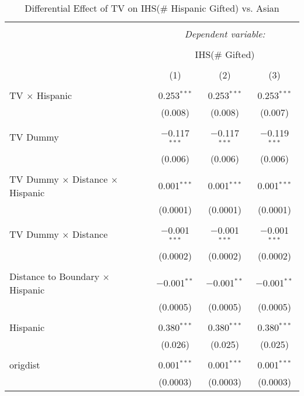
\begin{table}[!htbp] \centering 
  \caption{Differential Effect of TV on IHS(\# Hispanic Gifted) vs. Asian} 
  \label{} 
\begin{tabular}{@{\extracolsep{-2pt}}lccc} 
\\[-1.8ex]\hline 
\hline \\[-1.8ex] 
 & \multicolumn{3}{c}{\textit{Dependent variable:}} \\ 
\cline{2-4} 
\\[-1.8ex] & \multicolumn{3}{c}{IHS(\# Gifted)} \\ 
\\[-1.8ex] & (1) & (2) & (3)\\ 
\hline \\[-1.8ex] 
 TV $\times$ Hispanic & 0.253$^{***}$ & 0.253$^{***}$ & 0.253$^{***}$ \\ 
  & (0.008) & (0.008) & (0.007) \\ 
  & & & \\ 
 TV Dummy & $-$0.117$^{***}$ & $-$0.117$^{***}$ & $-$0.119$^{***}$ \\ 
  & (0.006) & (0.006) & (0.006) \\ 
  & & & \\ 
 TV Dummy $\times$ Distance $\times$ Hispanic & 0.001$^{***}$ & 0.001$^{***}$ & 0.001$^{***}$ \\ 
  & (0.0001) & (0.0001) & (0.0001) \\ 
  & & & \\ 
 TV Dummy $\times$ Distance & $-$0.001$^{***}$ & $-$0.001$^{***}$ & $-$0.001$^{***}$ \\ 
  & (0.0002) & (0.0002) & (0.0002) \\ 
  & & & \\ 
 Distance to Boundary $\times$ Hispanic & $-$0.001$^{**}$ & $-$0.001$^{**}$ & $-$0.001$^{**}$ \\ 
  & (0.0005) & (0.0005) & (0.0005) \\ 
  & & & \\ 
 Hispanic & 0.380$^{***}$ & 0.380$^{***}$ & 0.380$^{***}$ \\ 
  & (0.026) & (0.025) & (0.025) \\ 
  & & & \\ 
 origdist & 0.001$^{***}$ & 0.001$^{***}$ & 0.001$^{***}$ \\ 
  & (0.0003) & (0.0003) & (0.0003) \\ 

\end{tabular}
\end{table}
